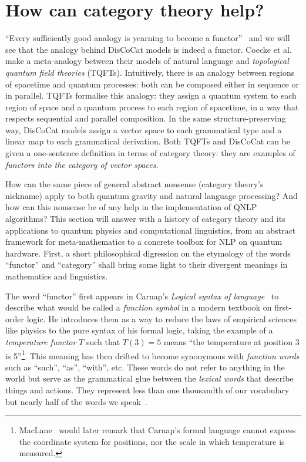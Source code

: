
\section*{How can category theory help?}


``Every sufficiently good analogy is yearning to become a functor''~\cite{Baez06} and we will see that the analogy behind DisCoCat models is indeed a functor.
Coecke et al.~\cite{CoeckeEtAl13} make a meta-analogy between their models of natural language and \emph{topological quantum field theories} (TQFTs).
Intuitively, there is an analogy between regions of spacetime and quantum processes: both can be composed either in sequence or in parallel.
TQFTs formalise this analogy: they assign a quantum system to each region of space and a quantum process to each region of spacetime, in a way that respects sequential and parallel composition.
In the same structure-preserving way, DisCoCat models assign a vector space to each grammatical type and a linear map to each grammatical derivation.
Both TQFTs and DisCoCat can be given a one-sentence definition in terms of category theory: they are examples of \emph{functors into the category of vector spaces}.

How can the same piece of general abstract nonsense (category theory's nickname) apply to both quantum gravity and natural language processing?
And how can this nonsense be of any help in the implementation of QNLP algorithms?
This section will answer with a history of category theory and its applications to quantum physics and computational linguistics, from an abstract framework for meta-mathematics to a concrete toolbox for NLP on quantum hardware.
First, a short philosophical digression on the etymology of the words ``functor'' and ``category'' shall bring some light to their divergent meanings in mathematics and linguistics.

The word ``functor'' first appears in Carnap's \emph{Logical syntax of language}~\cite{Carnap37} to describe what would be called a \emph{function symbol} in a modern textbook on first-order logic.
He introduces them as a way to reduce the laws of empirical sciences like physics to the pure syntax of his formal logic, taking the example of a \emph{temperature functor} $T$ such that $T(3) = 5$ means ``the temperature at position 3 is 5''\footnote
{MacLane~\cite{MacLane38} would later remark that Carnap's formal language cannot express the coordinate system for positions, nor the scale in which temperature is measured.}.
This meaning has then drifted to become synonymous with \emph{function words} such as ``such'', ``as'', ``with'', etc. These words do not refer to anything in the world but serve as the grammatical glue between the \emph{lexical words} that describe things and actions.
They represent less than one thousandth of our vocabulary but nearly half of the words we speak~\cite{ChungPennebaker07}.

